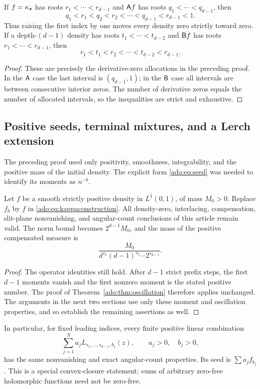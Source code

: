 \begin{corollary}
\label{ado:cor:interlacing}
If $f=\kappa_{\boldsymbol{s}}$ has roots $r_1<\cdots<r_{d-1}$ and
$\mathsf A f$ has roots $q_1<\cdots<q_{d-1}$, then
\begin{equation}\label{ado:eq:Ainterlace}
 q_1<r_1<q_2<r_2<\cdots<q_{d-1}<r_{d-1}<1.
\end{equation}
Thus raising the first index by one moves every density zero strictly
toward zero. If a depth-$(d-1)$ density has roots
$t_1<\cdots<t_{d-2}$ and $\mathsf B f$ has roots $r_1<\cdots<r_{d-1}$,
then
\begin{equation}\label{ado:eq:Binterlace}
 r_1<t_1<r_2<\cdots<t_{d-2}<r_{d-1}.
\end{equation}
\end{corollary}
\begin{proof}
These are precisely the derivative-zero allocations in the preceding
proof. In the $\mathsf A$ case the last interval is $(q_{d-1},1)$; in the
$\mathsf B$ case all intervals are between consecutive interior zeros.
The number of derivative zeros equals the number of allocated intervals,
so the inequalities are strict and exhaustive.
\end{proof}

\subsection{Positive seeds, terminal mixtures, and a Lerch extension}
The preceding proof used only positivity, smoothness, integrability, and
the positive mass of the initial density. The explicit form
\eqref{ado:eq:seed} was needed to identify its moments as $n^{-b}$.

\begin{theorem}
\label{ado:thm:seedextension}
Let $f$ be a smooth strictly positive density in $L^1(0,1)$, of mass
$M_0>0$. Replace $f_b$ by $f$ in \eqref{ado:eq:kappaconstruction}.
All density-zero, interlacing, compensation, slit-plane nonvanishing,
and angular-count conclusions of this article remain valid. The norm
bound becomes $2^{d-1}M_0$, and the mass of the positive compensated
measure is
\[
 \frac{M_0}{d^{s_1}(d-1)^{s_2}\cdots2^{s_{d-1}}}.
\]
\end{theorem}
\begin{proof}
The operator identities still hold. After $d-1$ strict prefix steps,
the first $d-1$ moments vanish and the first nonzero moment is the
stated positive number. The proof of Theorem~\ref{ado:thm:oscillation}
therefore applies unchanged. The arguments in the next two sections
use only these moment and oscillation properties, and so establish the
remaining assertions as well.
\end{proof}
In particular, for fixed leading indices, every finite positive linear
combination
\begin{equation}\label{ado:eq:terminalmixture}
 \sum_{j=1}^N a_j L_{s_1,\ldots,s_{d-1},b_j}(z),
 \qquad a_j>0,\quad b_j>0,
\end{equation}
has the same nonvanishing and exact angular-count properties. Its seed
is $\sum a_jf_{b_j}$. This is a special convex-closure statement; sums
of arbitrary zero-free holomorphic functions need not be zero-free.

